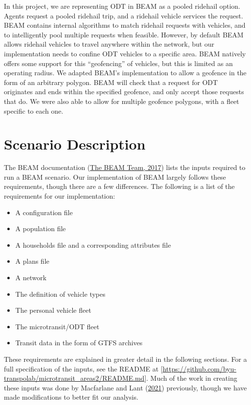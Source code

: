 \documentclass[
]{report}
\providecommand{\tightlist}{%
  \setlength{\itemsep}{0pt}\setlength{\parskip}{0pt}}
\begin{document}
In this project, we are representing ODT in BEAM as a pooled ridehail option. Agents request a pooled ridehail trip, and a ridehail vehicle services the request. BEAM contains internal algorithms to match ridehail requests with vehicles, and to intelligently pool multiple requests when feasible. However, by default BEAM allows ridehail vehicles to travel anywhere within the network, but our implementation needs to confine ODT vehicles to a specific area. BEAM natively offers some support for this ``geofencing'' of vehicles, but this is limited as an operating radius. We adapted BEAM's implementation to allow a geofence in the form of an arbitrary polygon. BEAM will check that a request for ODT originates and ends within the specified geofence, and only accept those requests that do. We were also able to allow for multiple geofence polygons, with a fleet specific to each one.

\hypertarget{scenario-description}{%
\section{Scenario Description}\label{scenario-description}}

The BEAM documentation (\protect\hyperlink{ref-beamdocs}{The BEAM Team, 2017}) lists the inputs required to run a BEAM scenario. Our implementation of BEAM largely follows these requirements, though there are a few differences. The following is a list of the requirements for our implementation:

\begin{itemize}
\tightlist
\item
  A configuration file
\item
  A population file
\item
  A households file and a corresponding attributes file
\item
  A plans file
\item
  A network
\item
  The definition of vehicle types
\item
  The personal vehicle fleet
\item
  The microtransit/ODT fleet
\item
  Transit data in the form of GTFS archives
\end{itemize}

These requirements are explained in greater detail in the following sections. For a full specification of the inputs, see the README at {[}\url{https://github.com/byu-transpolab/microtransit_areas2/README.md}{]}. Much of the work in creating these inputs was done by Macfarlane and Lant (\protect\hyperlink{ref-MacfarlaneLant}{2021}) previously, though we have made modifications to better fit our analysis.
\end{document}
